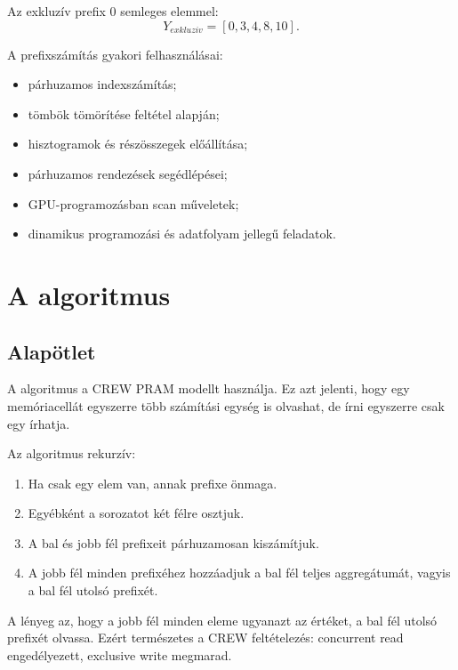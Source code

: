 Az exkluzív prefix $0$ semleges elemmel:
\[
  Y_{exkluziv}=[0,3,4,8,10].
\]

A prefixszámítás gyakori felhasználásai:

\begin{itemize}
  \item párhuzamos indexszámítás;
  \item tömbök tömörítése feltétel alapján;
  \item hisztogramok és részösszegek előállítása;
  \item párhuzamos rendezések segédlépései;
  \item GPU-programozásban scan műveletek;
  \item dinamikus programozási és adatfolyam jellegű feladatok.
\end{itemize}

\section{A  algoritmus}

\subsection{Alapötlet}

A  algoritmus a CREW PRAM modellt használja. Ez azt jelenti, hogy egy memóriacellát egyszerre több számítási egység is olvashat, de írni egyszerre csak egy írhatja.

Az algoritmus rekurzív:

\begin{enumerate}
  \item Ha csak egy elem van, annak prefixe önmaga.
  \item Egyébként a sorozatot két félre osztjuk.
  \item A bal és jobb fél prefixeit párhuzamosan kiszámítjuk.
  \item A jobb fél minden prefixéhez hozzáadjuk a bal fél teljes aggregátumát, vagyis a bal fél utolsó prefixét.
\end{enumerate}



A lényeg az, hogy a jobb fél minden eleme ugyanazt az értéket, a bal fél utolsó prefixét olvassa. Ezért természetes a CREW feltételezés: concurrent read engedélyezett, exclusive write megmarad.



